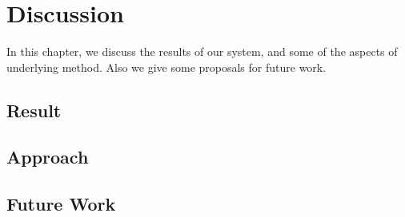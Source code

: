 \chapter{Discussion}
In this chapter, we discuss the results of our system, and some of the aspects of underlying method. Also we give some proposals for future work.
\section{Result}
\section{Approach}
\section{Future Work}